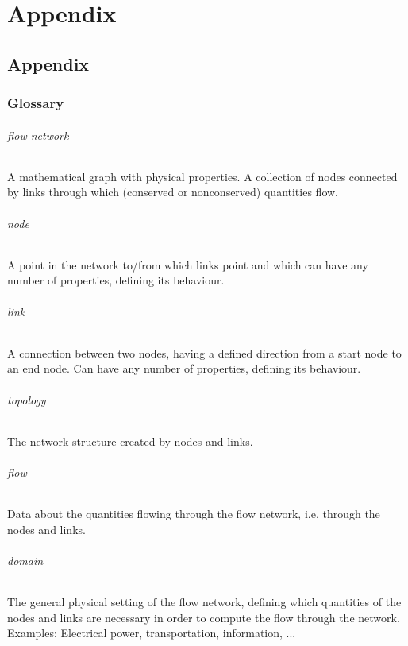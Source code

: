 \documentclass[11pt,fleqn]{book} %
\begin{document}

\part{Appendix}

\chapter{Appendix}

\section{Glossary}
\paragraph{flow network}
A mathematical graph with physical properties. A collection of nodes connected by links through which (conserved or nonconserved) quantities flow.

\paragraph{node}
A point in the network to/from which links point and which can have any number of properties, defining its behaviour.

\paragraph{link}
A connection between two nodes, having a defined direction from a start node to an end node. Can have any number of properties, defining its behaviour.

\paragraph{topology}
The network structure created by nodes and links.

\paragraph{flow}
Data about the quantities flowing through the flow network, i.e. through the nodes and links.

\paragraph{domain}
The general physical setting of the flow network, defining which quantities of the nodes and links are necessary in order to compute the flow through the network. Examples: Electrical power, transportation, information, ...
\end{document}
